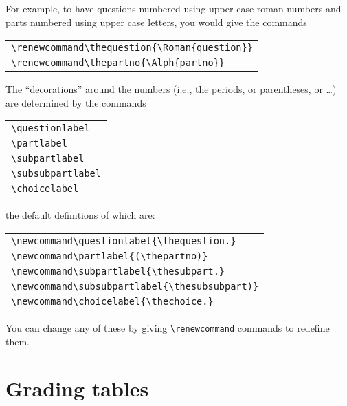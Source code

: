 \documentclass[12pt]{exam}
\begin{document}
For example, to have questions numbered using upper case roman numbers
and parts numbered using upper case letters, you would give the
commands
\begin{center}
  \begin{tabular}{l}
    \verb"\renewcommand\thequestion{\Roman{question}}"\\
    \verb"\renewcommand\thepartno{\Alph{partno}}"
  \end{tabular}
\end{center}

\bigskip


The ``decorations'' around the numbers (i.e., the periods, or
parentheses, or \ldots) are determined by the commands
\begin{center}
  \begin{tabular}{l}
    \verb"\questionlabel"\\
    \verb"\partlabel"\\
    \verb"\subpartlabel"\\
    \verb"\subsubpartlabel"\\
    \verb"\choicelabel"
  \end{tabular}
\end{center}
the default definitions of which are:
\begin{center}
  \begin{tabular}{l}
    \verb"\newcommand\questionlabel{\thequestion.}"\\
    \verb"\newcommand\partlabel{(\thepartno)}"\\
    \verb"\newcommand\subpartlabel{\thesubpart.}"\\
    \verb"\newcommand\subsubpartlabel{\thesubsubpart)}"\\
    \verb"\newcommand\choicelabel{\thechoice.}"
  \end{tabular}
\end{center}
You can change any of these by giving \verb"\renewcommand" commands to
redefine them.


\section{Grading tables}
\label{sec:Gradetable}

\newlength\cwidth
\end{document}
